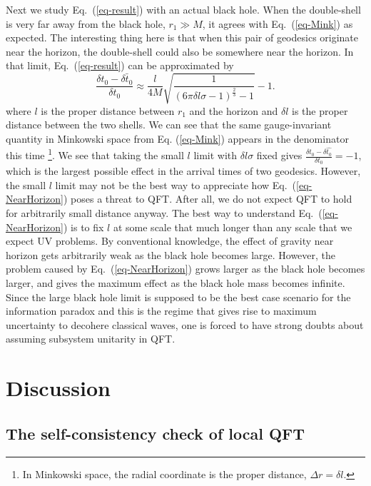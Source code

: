 \documentclass[aps,showpacs,twocolumn,floats,prd,superscriptaddress,nofootinbib]{revtex4-1}
\begin{document}
Next we study Eq.~(\ref{eq-result}) with an actual black hole. 
When the double-shell is very far away from the black hole, $r_1\gg M$, it agrees with Eq.~(\ref{eq-Mink}) as expected. 
The interesting thing here is that when this pair of geodesics originate near the horizon, the double-shell could also be somewhere near the horizon. 
In that limit, Eq.~(\ref{eq-result}) can be approximated by
\begin{equation}
	\frac{\delta t_0 - \bar{\delta t_0}}{\delta t_0} \approx \frac{l}{4M} \sqrt{\frac{1}{(6 \pi \delta l \sigma - 1)^\frac{2}{3} -1 }} - 1.	\label{eq-NearHorizon}
\end{equation}
where $l$ is the proper distance between $r_1$ and the horizon and $\delta l$ is the proper distance between the two shells. 
We can see that the same gauge-invariant quantity in Minkowski space from Eq. (\ref{eq-Mink}) appears in the denominator this time
\footnote{In Minkowski space, the radial coordinate is the proper distance, $\Delta r=\delta l$.}. We see that taking the small $l$ limit with $\delta l \sigma$ fixed gives $\frac{\delta t_0 - \delta \hat{t_0}}{\delta t_0} = -1$, which is the largest possible effect in the arrival times of two geodesics. However, the small $l$ limit may not be the best way to appreciate how Eq.~(\ref{eq-NearHorizon}) poses a threat to QFT. 
After all, we do not expect QFT to hold for arbitrarily small distance anyway. 
The best way to understand Eq.~(\ref{eq-NearHorizon}) is to fix $l$ at some scale that much longer than any scale that we expect UV problems. 
By conventional knowledge, the effect of gravity near horizon gets arbitrarily weak as the black hole becomes large. 
However, the problem caused by Eq.~(\ref{eq-NearHorizon}) grows larger as the black hole becomes larger, and gives the maximum effect as the black hole mass becomes infinite.
Since the large black hole limit is supposed to be the best case scenario for the information paradox and this is the regime that gives rise to maximum uncertainty to decohere classical waves, one is forced to have strong doubts about assuming subsystem unitarity in QFT.

\section{Discussion}
\label{sec-dis}

\subsection{The self-consistency check of local QFT}
\end{document}
